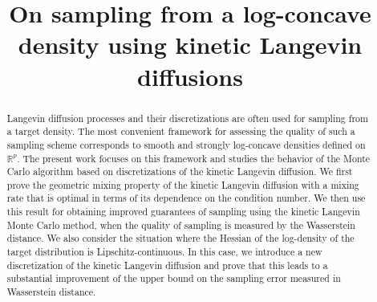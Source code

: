 \documentclass[a4paper,bej,preprint,reqno]{imsart}
\newcommand\RR{\mathbb R}
\begin{document}
\begin{frontmatter}

\title{On sampling from a log-concave density using kinetic Langevin diffusions}





\begin{abstract}
Langevin diffusion processes and their discretizations are often used for sampling from a target density. The most convenient framework for assessing the quality of such a sampling scheme corresponds to smooth and strongly log-concave densities defined on $\RR^p$. The present work focuses on this framework and studies the behavior of the Monte Carlo algorithm based on discretizations of the kinetic Langevin diffusion. We first prove the geometric mixing property of the kinetic Langevin diffusion with a  mixing rate that is optimal in terms of its dependence on the condition number. We then use this result for obtaining improved guarantees of sampling using the kinetic Langevin Monte Carlo method, when the quality of sampling is measured by the Wasserstein distance. We also consider the situation where the Hessian of the log-density of the target distribution is Lipschitz-continuous. In this case, we introduce a new discretization of the kinetic Langevin diffusion and prove that this leads to a substantial improvement of the upper bound on the sampling error measured in Wasserstein distance.
\end{abstract}

\begin{keyword}[class=AMS]
\kwd{}
\end{keyword}

\begin{keyword}
\end{keyword}

\end{frontmatter}
\end{document}
